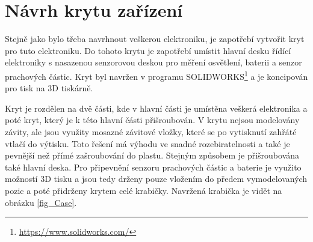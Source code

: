 \chapter{Návrh krytu zařízení}

Stejně jako bylo třeba navrhnout veškerou elektroniku, je zapotřebí vytvořit kryt pro tuto elektroniku. Do tohoto krytu je zapotřebí umístit hlavní desku řídící elektroniky s nasazenou senzorovou deskou pro měření osvětlení, baterii a senzor prachových částic. Kryt byl navržen v programu SOLIDWORKS\footnote{\url{https://www.solidworks.com/}} a je koncipován pro tisk na 3D tiskárně. 

Kryt je rozdělen na dvě části, kde v hlavní části je umístěna veškerá elektronika a poté kryt, který je k této hlavní části přišroubován. V krytu nejsou modelovány závity, ale jsou využity mosazné závitové vložky, které se po vytisknutí zahřáté vtlačí do výtisku. Toto řešení má výhodu ve snadné rozebiratelnosti a také je pevnější než přímé zašroubování do plastu. Stejným způsobem je přišroubována také hlavní deska. Pro připevnění senzoru prachových částic a baterie je využito možností 3D tisku a jsou tedy drženy pouze vložením do předem vymodelovaných pozic a poté přidrženy krytem celé krabičky. Navržená krabička je vidět na obrázku \ref{fig_Case}.

